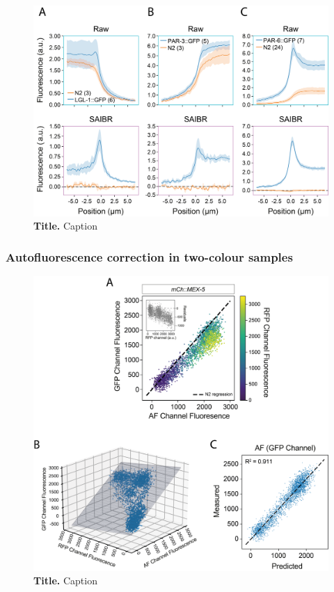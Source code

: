 \documentclass[11pt]{"article"}
\newcommand{\mycaption}[2]{\caption[#1]{\textbf{#1.} #2}}
\begin{document}
\begin{figure}[!h]
\includegraphics[scale=1]{saibr_membrane_profiles}
\setlength{\abovecaptionskip}{20pt}
\centering
\mycaption{Title}{Caption}
\end{figure}

\clearpage
\subsubsection{Autofluorescence correction in two-colour samples}

\begin{figure}[!h]
\includegraphics[scale=1]{saibr_3channel_correlation}
\setlength{\abovecaptionskip}{20pt}
\centering
\mycaption{Title}{Caption}
\end{figure}
\end{document}
